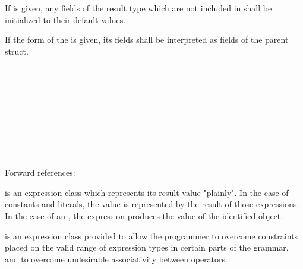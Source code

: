 \specsubsubitem
If  is given, any fields of the result type which are not
included in  shall be initialized to their default
values.

\specsubsubitem
If the  form of the  is
given, its fields shall be interpreted as fields of the parent struct.



\begin{grammar}
 \\
	 \\
	 \\
	 \\
	 \\

 \\
	 \\
	\terminal{(}  \terminal{)} \\
\end{grammar}

Forward references: 

\specsubsubitem
{} is an expression class which represents its
result value "plainly". In the case of constants and literals, the value is
represented by the result of those expressions. In the case of an
, the expression produces the value of the identified
object.

\specsubsubitem
{} is an expression class provided to allow the
programmer to overcome constraints placed on the valid range of expression
types in certain parts of the grammar, and to overcome undesirable
associativity between operators.


\begin{grammar}
 \\
	 \terminal{(}  \terminal{)} \\

 \\
	 \optional{\terminal{,}} \\
	  \optional{\terminal{,}} \\
	 \terminal{,}  \\
\end{grammar}

